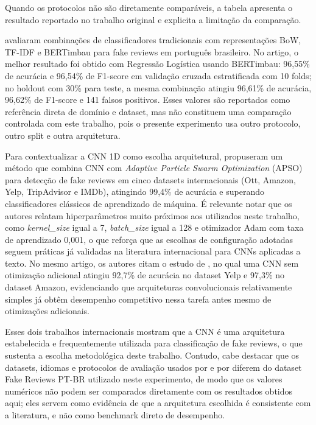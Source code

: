 \documentclass[12pt,a4paper]{article}
\begin{document}
Quando os protocolos não são diretamente comparáveis, a tabela apresenta o resultado reportado no trabalho original e explicita a limitação da comparação.

 avaliaram combinações de classificadores tradicionais com representações BoW, TF-IDF e BERTimbau para fake reviews em português brasileiro. No artigo, o melhor resultado foi obtido com Regressão Logística usando BERTimbau: 96,55\% de acurácia e 96,54\% de F1-score em validação cruzada estratificada com 10 folds; no holdout com 30\% para teste, a mesma combinação atingiu 96,61\% de acurácia, 96,62\% de F1-score e 141 falsos positivos. Esses valores são reportados como referência direta de domínio e dataset, mas não constituem uma comparação controlada com este trabalho, pois o presente experimento usa outro protocolo, outro split e outra arquitetura.

Para contextualizar a CNN 1D como escolha arquitetural,  propuseram um método que combina CNN com \textit{Adaptive Particle Swarm Optimization} (APSO) para detecção de fake reviews em cinco datasets internacionais (Ott, Amazon, Yelp, TripAdvisor e IMDb), atingindo 99,4\% de acurácia e superando classificadores clássicos de aprendizado de máquina. É relevante notar que os autores relatam hiperparâmetros muito próximos aos utilizados neste trabalho, como \textit{kernel\_size} igual a 7, \textit{batch\_size} igual a 128 e otimizador Adam com taxa de aprendizado 0,001, o que reforça que as escolhas de configuração adotadas seguem práticas já validadas na literatura internacional para CNNs aplicadas a texto. No mesmo artigo, os autores citam o estudo de , no qual uma CNN sem otimização adicional atingiu 92,7\% de acurácia no dataset Yelp e 97,3\% no dataset Amazon, evidenciando que arquiteturas convolucionais relativamente simples já obtêm desempenho competitivo nessa tarefa antes mesmo de otimizações adicionais.

Esses dois trabalhos internacionais mostram que a CNN é uma arquitetura estabelecida e frequentemente utilizada para classificação de fake reviews, o que sustenta a escolha metodológica deste trabalho. Contudo, cabe destacar que os datasets, idiomas e protocolos de avaliação usados por  e por  diferem do dataset Fake Reviews PT-BR utilizado neste experimento, de modo que os valores numéricos não podem ser comparados diretamente com os resultados obtidos aqui; eles servem como evidência de que a arquitetura escolhida é consistente com a literatura, e não como benchmark direto de desempenho.
\end{document}
